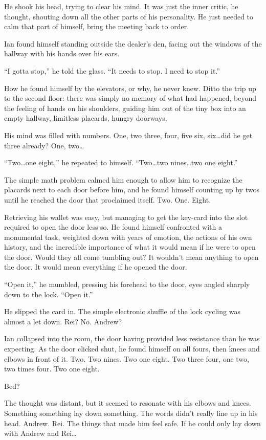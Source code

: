 He shook his head, trying to clear his mind. It was just the inner critic, he thought, shouting down all the other parts of his personality. He just needed to calm that part of himself, bring the meeting back to order.

Ian found himself standing outside the dealer's den, facing out the windows of the hallway with his hands over his ears.

``I gotta stop,'' he told the glass. ``It needs to stop. I need to stop it.''

How he found himself by the elevators, or why, he never knew. Ditto the trip up to the second floor: there was simply no memory of what had happened, beyond the feeling of hands on his shoulders, guiding him out of the tiny box into an empty hallway, limitless placards, hungry doorways.

His mind was filled with numbers. One, two three, four, five six, six\ldots{}did he get three already? One, two\ldots{}

``Two\ldots{}one eight,'' he repeated to himself. ``Two\ldots{}two nines\ldots{}two one eight.''

The simple math problem calmed him enough to allow him to recognize the placards next to each door before him, and he found himself counting up by twos until he reached the door that proclaimed itself. Two. One. Eight.

Retrieving his wallet was easy, but managing to get the key-card into the slot required to open the door less so. He found himself confronted with a monumental task, weighted down with years of emotion, the actions of his own history, and the incredible importance of what it would mean if he were to open the door. Would they all come tumbling out? It wouldn't mean anything to open the door. It would mean everything if he opened the door.

``Open it,'' he mumbled, pressing his forehead to the door, eyes angled sharply down to the lock. ``Open it.''

He slipped the card in. The simple electronic shuffle of the lock cycling was almost a let down. Rei? No. Andrew?

Ian collapsed into the room, the door having provided less resistance than he was expecting. As the door clicked shut, he found himself on all fours, then knees and elbows in front of it. Two. Two nines. Two one eight. Two three four, one two, two times four. Two one eight.

Bed?

The thought was distant, but it seemed to resonate with his elbows and knees. Something something lay down something. The words didn't really line up in his head. Andrew. Rei. The things that made him feel safe. If he could only lay down with Andrew and Rei\ldots{}

